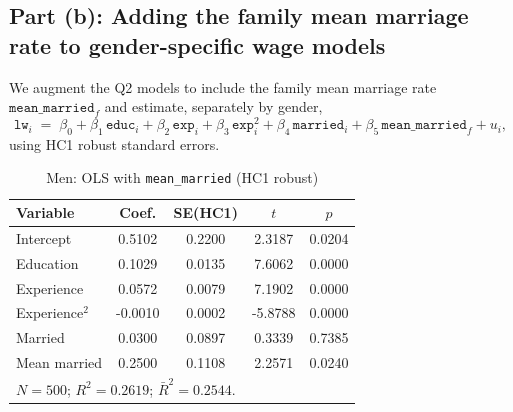 \documentclass[12pt]{article}
\begin{document}
\subsection*{Part (b): Adding the family mean marriage rate to gender-specific wage models}

We augment the Q2 models to include the family mean marriage rate \(\texttt{mean\_married}_f\) and estimate, separately by gender,
\[
  \texttt{lw}_{i} \;=\; \beta_0 + \beta_1\,\texttt{educ}_{i}
  + \beta_2\,\texttt{exp}_{i} + \beta_3\,\texttt{exp}_{i}^{2}
  + \beta_4\,\texttt{married}_{i}
  + \beta_5\,\texttt{mean\_married}_{f} + u_{i},
\]
using HC1 robust standard errors.

\begin{table}[htbp]
  \centering
  \caption{Men: OLS with \texttt{mean\_married} (HC1 robust)}
  \label{tab:q3b_men}
  \small
  \begin{tabular}{l
                  S[table-format=1.4]
                  S[table-format=1.4]
                  S[table-format=2.4]
                  S[table-format=1.4]}
    \toprule
    Variable & {Coef.} & {SE(HC1)} & {$t$} & {$p$} \\
    \midrule
    Intercept         & 0.5102 & 0.2200 &  2.3187 & 0.0204 \\
    Education         & 0.1029 & 0.0135 &  7.6062 & 0.0000 \\
    Experience        & 0.0572 & 0.0079 &  7.1902 & 0.0000 \\
    Experience$^{2}$  & -0.0010& 0.0002 & -5.8788 & 0.0000 \\
    Married           & 0.0300 & 0.0897 &  0.3339 & 0.7385 \\
    Mean married      & 0.2500 & 0.1108 &  2.2571 & 0.0240 \\
    \midrule
     \\
    \bottomrule
  \end{tabular}
\end{table}
\end{document}

